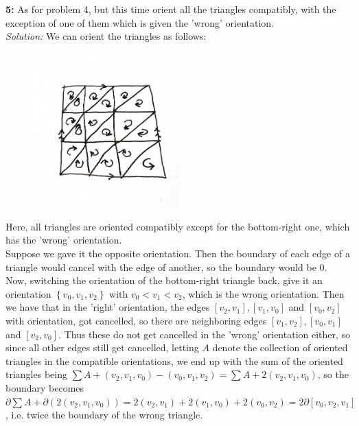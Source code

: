 \documentclass[a4paper]{article}
\begin{document}
    \textbf{5:} As for problem 4, but this time orient all the triangles
    compatibly, with the exception of one of them which is given the
    'wrong' orientation.\\
    \textit{Solution:} We can orient the triangles as follows:
    \begin{figure}[H]
        \centering
        \includegraphics[width=0.5\textwidth]{5.jpeg}
        \label{fig:5-jpeg}
    \end{figure}
    Here, all triangles are oriented compatibly except for the bottom-right
    one, which has the 'wrong' orientation.\\
    Suppose we gave it the opposite orientation. Then
    the boundary of each edge of a triangle would cancel with the edge of
    another, so the boundary would be $0$. Now, switching the orientation of
    the bottom-right triangle back, give it an orientation
    $\left\{ v_0, v_1, v_2 \right\} $ with $v_0 < v_1 < v_2$, which is the
    wrong orientation. Then we have that
    in the 'right' orientation, the edges
    $\left[ v_2, v_1 \right] , \left[ v_1, v_0 \right] $ and
    $\left[ v_0, v_2 \right] $ with orientation, got cancelled, so there are
    neighboring edges
    $\left[ v_1, v_2 \right] , \left[ v_0 , v_1 \right] $ and
    $\left[ v_2, v_0 \right] $. Thus these do not get cancelled in the 'wrong'
    orientation either, so since all other edges still get cancelled, letting
    $A$ denote the collection of oriented triangles in the compatible
    orientations, we end up
    with the sum of the oriented triangles being
    $  \sum A + (v_2, v_1, v_0) - (v_0, v_1, v_2)
    = \sum A + 2 (v_2, v_1, v_0)$, so the boundary becomes
    $\partial \sum A + \partial \left( 2 (v_2, v_1, v_0) \right) 
    = 2 ( v_2, v_1 ) + 2 ( v_1, v_0 ) +
    2 ( v_0, v_2 ) 
    = 2 \partial \left[ v_0, v_2, v_1 \right] $, i.e. twice the boundary of the
    wrong triangle.
\end{document}
